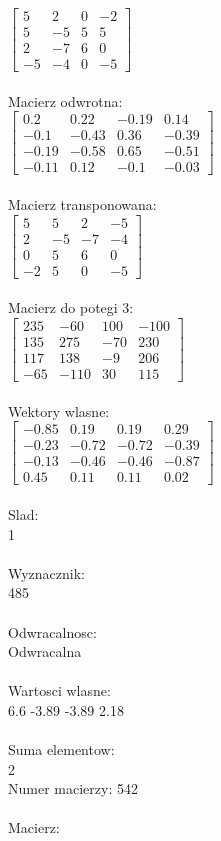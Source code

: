 \documentclass[a4paper,12pt]{article}
\begin{document}
$\begin{bmatrix} 5&2&0&-2\\5&-5&5&5\\2&-7&6&0\\-5&-4&0&-5 \end{bmatrix}$
\\
\\
Macierz odwrotna:\\

$\begin{bmatrix} 0.2&0.22&-0.19&0.14\\-0.1&-0.43&0.36&-0.39\\-0.19&-0.58&0.65&-0.51\\-0.11&0.12&-0.1&-0.03 \end{bmatrix}$
\\
\\
Macierz transponowana:\\

$\begin{bmatrix} 5&5&2&-5\\2&-5&-7&-4\\0&5&6&0\\-2&5&0&-5 \end{bmatrix}$
\\
\\
Macierz do potegi 3:\\

$\begin{bmatrix} 235&-60&100&-100\\135&275&-70&230\\117&138&-9&206\\-65&-110&30&115 \end{bmatrix}$
\\
\\
Wektory wlasne:\\

$\begin{bmatrix} -0.85&0.19&0.19&0.29\\-0.23&-0.72&-0.72&-0.39\\-0.13&-0.46&-0.46&-0.87\\0.45&0.11&0.11&0.02 \end{bmatrix}$
\\
\\
Slad:\\
1
\\
\\
Wyznacznik:\\
485
\\
\\
Odwracalnosc:\\
Odwracalna
\\
\\
Wartosci wlasne:\\
6.6 -3.89 -3.89 2.18
\\
\\
Suma elementow:\\
2
\\
\newpage
Numer macierzy:
542
\\
\\
Macierz:\\
\end{document}

